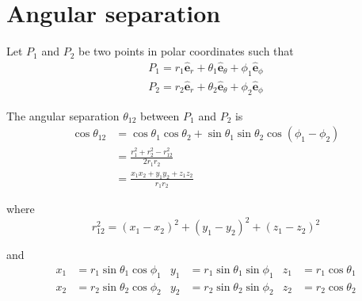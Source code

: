

\section*{Angular separation}

Let $P_1$ and $P_2$ be two points in polar coordinates such that
\begin{align*}
P_1=r_1\hat{\mathbf e}_r+\theta_1\hat{\mathbf e}_\theta+\phi_1\hat{\mathbf e}_\phi
\\
P_2=r_2\hat{\mathbf e}_r+\theta_2\hat{\mathbf e}_\theta+\phi_2\hat{\mathbf e}_\phi
\end{align*}

The angular separation $\theta_{12}$ between $P_1$ and $P_2$ is
\begin{align*}
\cos\theta_{12}
&=\cos\theta_1\cos\theta_2+\sin\theta_1\sin\theta_2\cos(\phi_1-\phi_2)
\\
&=\frac{r_1^2+r_2^2-r_{12}^2}{2r_1r_2}
\\
&=\frac{x_1x_2+y_1y_2+z_1z_2}{r_1r_2}
\end{align*}

where
\begin{equation*}
r_{12}^2=(x_1-x_2)^2+(y_1-y_2)^2+(z_1-z_2)^2
\end{equation*}

and
\begin{align*}
x_1&=r_1\sin\theta_1\cos\phi_1
&
y_1&=r_1\sin\theta_1\sin\phi_1
&
z_1&=r_1\cos\theta_1
\\
x_2&=r_2\sin\theta_2\cos\phi_2
&
y_2&=r_2\sin\theta_2\sin\phi_2
&
z_2&=r_2\cos\theta_2
\end{align*}


